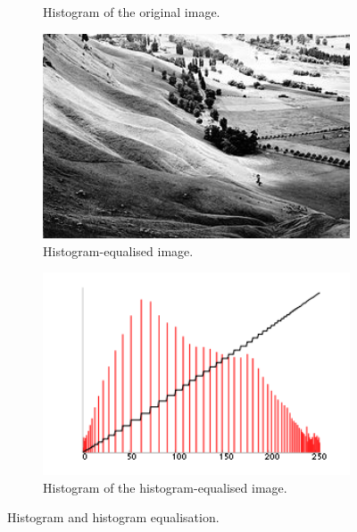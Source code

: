 \documentclass[12pt, twocolumn]{report}
\begin{document}
\begin{figure}[htbp]
\begin{subfigure}{0.4\textwidth}
        \caption{Histogram of the original image.}
        \label{Histogram equalisation inital image histogram}
    \end{subfigure}
    \begin{subfigure}{0.4\textwidth}
        \centering
        \includegraphics[width=1\textwidth]{Figures/Histogram equalisation final image.jpg}
        \caption{Histogram-equalised image.}
        \label{Histogram equalisation final image}
    \end{subfigure}
    \begin{subfigure}{0.4\textwidth}
        \centering
        \includegraphics[width=1\textwidth]{Figures/Histogram equalisation final image histogram.png}
        \caption{Histogram of the histogram-equalised image.}
        \label{Histogram equalisation final image histogram}
    \end{subfigure}
    \caption{Histogram and histogram equalisation.}
    \label{Histogram and histogram equalisation}
\end{figure}
\end{document}
